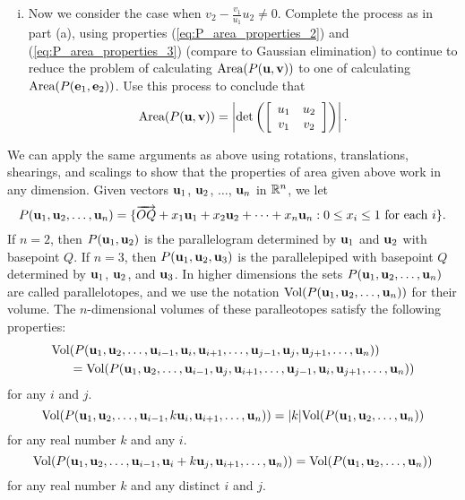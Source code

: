\begin{pactivity}
\begin{enumerate}[i.]
	\item Now we consider the case when $v_2-\frac{v_1}{u_1}u_2 \neq 0$. Complete the process as in part (a), using properties (\ref{eq:P_area_properties_2}) and  (\ref{eq:P_area_properties_3}) (compare to Gaussian elimination) to continue to reduce the problem of calculating $\text{Area}(P(\mathbf{u},\mathbf{v}))$ to one of calculating $\text{Area}(P(\mathbf{e}_1, \mathbf{e}_2))$. Use this process to conclude that 
\[\text{Area}(P(\mathbf{u},\mathbf{v})) = \left| \det\left(\left[ \begin{array}{cc} u_1&u_2\\v_1&v_2 \end{array} \right]\right)\right|.\]


	\end{enumerate}

\ea

\end{pactivity}

We can apply the same arguments as above using rotations, translations, shearings, and scalings to show that the properties of area given above work in any dimension. Given vectors $\mathbf{u}_1$, $\mathbf{u}_2$, $\ldots$, $\mathbf{u}_n$ in $\mathbb{R}^n$, we let 
\[P(\mathbf{u}_1, \mathbf{u}_2, \ldots, \mathbf{u}_n) = \{\overrightarrow{OQ}+x_1 \mathbf{u}_1 + x_2 \mathbf{u}_2 + \cdots + x_n \mathbf{u}_n : 0 \leq x_i \leq 1 \text{ for each } i\}.\]
If $n = 2$, then $P(\mathbf{u}_1,\mathbf{u}_2)$ is the parallelogram determined by $\mathbf{u}_1$ and $\mathbf{u}_2$ with basepoint $Q$. If $n = 3$, then $P(\mathbf{u}_1, \mathbf{u}_2, \mathbf{u}_3)$ is the parallelepiped with basepoint $Q$ determined by $\mathbf{u}_1$, $\mathbf{u}_2$, and $\mathbf{u}_3$. In higher dimensions the sets $P(\mathbf{u}_1, \mathbf{u}_2, \ldots,\mathbf{u}_n)$ are called parallelotopes, and we use the notation $\text{Vol}(P(\mathbf{u}_1, \mathbf{u}_2, \ldots,\mathbf{u}_n))$ for their volume. The $n$-dimensional volumes of these paralleotopes satisfy the following properties:
\begin{align}
\text{Vol}&(P(\mathbf{u}_1, \mathbf{u}_2, \ldots, \mathbf{u}_{i-1}, \mathbf{u}_i, \mathbf{u}_{i+1}, \ldots, \mathbf{u}_{j-1}, \mathbf{u}_j, \mathbf{u}_{j+1}, \ldots,\mathbf{u}_n)) \notag \\
&= \text{Vol}(P(\mathbf{u}_1, \mathbf{u}_2, \ldots, \mathbf{u}_{i-1}, \mathbf{u}_j, \mathbf{u}_{i+1}, \ldots, \mathbf{u}_{j-1}, \mathbf{u}_i, \mathbf{u}_{j+1}, \ldots,\mathbf{u}_n))  \label{eq:vol_property_1} 
\end{align}
for any $i$ and $j$. 
\begin{equation} 
\text{Vol}(P(\mathbf{u}_1,\mathbf{u}_2, \ldots, \mathbf{u}_{i-1}, k\mathbf{u}_i, \mathbf{u}_{i+1}, \ldots, \mathbf{u}_n)) 
= |k| \text{Vol}(P(\mathbf{u}_1,\mathbf{u}_2, \ldots, \mathbf{u}_n)) \label{eq:vol_property_2} 
\end{equation}
for any real number $k$ and any $i$. 
\begin{equation} 
\text{Vol}(P(\mathbf{u}_1,\mathbf{u}_2, \ldots, \mathbf{u}_{i-1}, \mathbf{u}_{i}+k\mathbf{u}_j, \mathbf{u}_{i+1}, \ldots, \mathbf{u}_n)) 
= \text{Vol}(P(\mathbf{u}_1,\mathbf{u}_2, \ldots, \mathbf{u}_n)) \label{eq:vol_property_3} 
\end{equation}
for any real number $k$ and any distinct $i$ and $j$.

